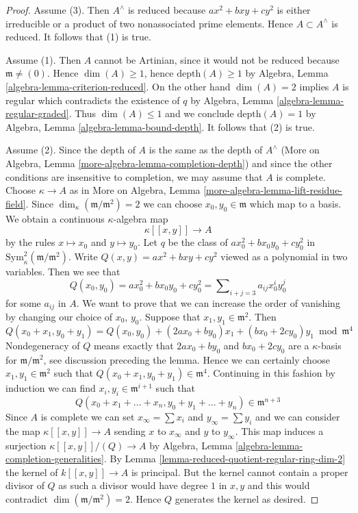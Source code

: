 \documentclass[10pt,a4paper]{amsart}
\theoremstyle{plain}
\theoremstyle{definition}
\theoremstyle{remark}
\numberwithin{equation}{subsection}
\begin{document}
\begin{proof}
Assume (3). Then $A^\wedge$ is reduced because $ax^2 + bxy + cy^2$
is either irreducible or a product of two nonassociated prime elements.
Hence $A \subset A^\wedge$ is reduced. It follows that (1) is true.

\medskip\noindent
Assume (1). Then $A$ cannot be Artinian, since it would not be reduced
because $\mathfrak m \not = (0)$.
Hence $\dim(A) \geq 1$, hence $\text{depth}(A) \geq 1$
by Algebra, Lemma \ref{algebra-lemma-criterion-reduced}.
On the other hand $\dim(A) = 2$ implies $A$ is regular
which contradicts the existence of $q$ by
Algebra, Lemma \ref{algebra-lemma-regular-graded}.
Thus $\dim(A) \leq 1$ and we conclude $\text{depth}(A) = 1$
by Algebra, Lemma \ref{algebra-lemma-bound-depth}.
It follows that (2) is true.

\medskip\noindent
Assume (2). Since the depth of $A$ is the same as the depth of $A^\wedge$
(More on Algebra, Lemma \ref{more-algebra-lemma-completion-depth})
and since the other conditions are insensitive to completion, we may
assume that $A$ is complete. Choose $\kappa \to A$ as in
More on Algebra, Lemma \ref{more-algebra-lemma-lift-residue-field}.
Since $\dim_\kappa(\mathfrak m/\mathfrak m^2) = 2$ we can choose
$x_0, y_0 \in \mathfrak m$ which map to a basis.
We obtain a continuous $\kappa$-algebra map
$$
\kappa[[x, y]] \longrightarrow A
$$
by the rules $x \mapsto x_0$ and $y \mapsto y_0$. Let
$q$ be the class of $ax_0^2 + bx_0y_0 + cy_0^2$ in
$\text{Sym}^2_\kappa(\mathfrak m/\mathfrak m^2)$.
Write $Q(x, y) = ax^2 + bxy + cy^2$ viewed as a polynomial
in two variables. Then we see that
$$
Q(x_0, y_0) = ax_0^2 + bx_0y_0 + cy_0^2 =
\sum\nolimits_{i + j = 3} a_{ij} x_0^iy_0^j
$$
for some $a_{ij}$ in $A$. We want to prove that we can
increase the order of vanishing by changing our choice
of $x_0$, $y_0$. Suppose that $x_1, y_1 \in \mathfrak m^2$.
Then
$$
Q(x_0 + x_1, y_0 + y_1) = Q(x_0, y_0) +
(2ax_0 + by_0)x_1 + (bx_0 + 2cy_0)y_1 \bmod \mathfrak m^4
$$
Nondegeneracy of $Q$ means exactly that $2ax_0 + by_0$ and $bx_0 + 2cy_0$
are a $\kappa$-basis for $\mathfrak m/\mathfrak m^2$, see discussion
preceding the lemma. Hence we can
certainly choose $x_1, y_1 \in \mathfrak m^2$ such that
$Q(x_0 + x_1, y_0 + y_1) \in \mathfrak m^4$.
Continuing in this fashion by induction
we can find $x_i, y_i \in \mathfrak m^{i + 1}$
such that
$$
Q(x_0 + x_1 + \ldots + x_n, y_0 + y_1 + \ldots + y_n) \in \mathfrak m^{n + 3}
$$
Since $A$ is complete we can set
$x_\infty = \sum x_i$ and $y_\infty = \sum y_i$
and we can consider the map $\kappa[[x, y]] \longrightarrow A$
sending $x$ to $x_\infty$ and $y$ to $y_\infty$. This map
induces a surjection $\kappa[[x, y]]/(Q) \longrightarrow A$ by
Algebra, Lemma \ref{algebra-lemma-completion-generalities}.
By Lemma \ref{lemma-reduced-quotient-regular-ring-dim-2}
the kernel of $k[[x, y]] \to A$ is principal.
But the kernel cannot contain a proper divisor of $Q$
as such a divisor would have degree $1$ in $x, y$
and this would contradict $\dim(\mathfrak m/\mathfrak m^2) = 2$.
Hence $Q$ generates the kernel as desired.
\end{proof}
\end{document}
